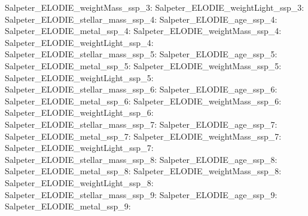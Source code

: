 Salpeter\_ELODIE\_weightMass\_ssp\_3:  \newline 
Salpeter\_ELODIE\_weightLight\_ssp\_3:  \newline 
Salpeter\_ELODIE\_stellar\_mass\_ssp\_4:  \newline 
Salpeter\_ELODIE\_age\_ssp\_4:  \newline 
Salpeter\_ELODIE\_metal\_ssp\_4:  \newline 
Salpeter\_ELODIE\_weightMass\_ssp\_4:  \newline 
Salpeter\_ELODIE\_weightLight\_ssp\_4:  \newline 
Salpeter\_ELODIE\_stellar\_mass\_ssp\_5:  \newline 
Salpeter\_ELODIE\_age\_ssp\_5:  \newline 
Salpeter\_ELODIE\_metal\_ssp\_5:  \newline 
Salpeter\_ELODIE\_weightMass\_ssp\_5:  \newline 
Salpeter\_ELODIE\_weightLight\_ssp\_5:  \newline 
Salpeter\_ELODIE\_stellar\_mass\_ssp\_6:  \newline 
Salpeter\_ELODIE\_age\_ssp\_6:  \newline 
Salpeter\_ELODIE\_metal\_ssp\_6:  \newline 
Salpeter\_ELODIE\_weightMass\_ssp\_6:  \newline 
Salpeter\_ELODIE\_weightLight\_ssp\_6:  \newline 
Salpeter\_ELODIE\_stellar\_mass\_ssp\_7:  \newline 
Salpeter\_ELODIE\_age\_ssp\_7:  \newline 
Salpeter\_ELODIE\_metal\_ssp\_7:  \newline 
Salpeter\_ELODIE\_weightMass\_ssp\_7:  \newline 
Salpeter\_ELODIE\_weightLight\_ssp\_7:  \newline 
Salpeter\_ELODIE\_stellar\_mass\_ssp\_8:  \newline 
Salpeter\_ELODIE\_age\_ssp\_8:  \newline 
Salpeter\_ELODIE\_metal\_ssp\_8:  \newline 
Salpeter\_ELODIE\_weightMass\_ssp\_8:  \newline 
Salpeter\_ELODIE\_weightLight\_ssp\_8:  \newline 
Salpeter\_ELODIE\_stellar\_mass\_ssp\_9:  \newline 
Salpeter\_ELODIE\_age\_ssp\_9:  \newline 
Salpeter\_ELODIE\_metal\_ssp\_9:  \newline 
